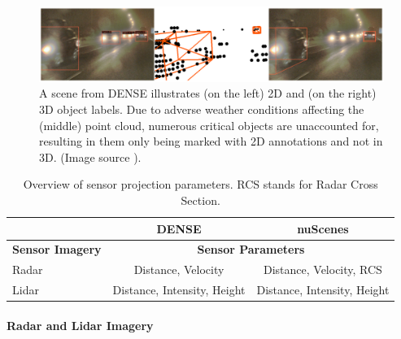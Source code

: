 \documentclass[report.tex]{subfiles}
\begin{document}
    \begin{figure}[h]
        \centering
        \includegraphics[width=1.0\textwidth]{images/methods/hrfuser/2d vs 3d annotations.png}
        \caption{A scene from DENSE \cite{bijelic2020seeing} illustrates (on the left) 2D and (on the right) 3D object labels. Due to adverse weather conditions affecting the (middle) point cloud, numerous critical objects are unaccounted for, resulting in them only being marked with 2D annotations and not in 3D. (Image source \cite{broedermann2022hrfuser}).}
        \label{fig:hrfuser_2d_vs_3d_annotations}
    \end{figure}

    \begin{table}[h]
        \centering
        \caption{Overview of sensor projection parameters. RCS stands for Radar Cross Section.}
        \begin{tabular}{|l|c|c|}
        \hline
        \cline{2-3}
               & DENSE           & nuScenes                        \\
        \hline
        \textbf{Sensor Imagery} & \multicolumn{2}{c|}{\textbf{Sensor Parameters}} \\
        \hline
        Radar & Distance, Velocity & Distance, Velocity, RCS \\
        \hline
        Lidar & Distance, Intensity, Height & Distance, Intensity, Height \\
        \hline
        \end{tabular}
        \label{tab:sensor_projection_parameters}
    \end{table}

    \paragraph*{Radar and Lidar Imagery}
\end{document}
